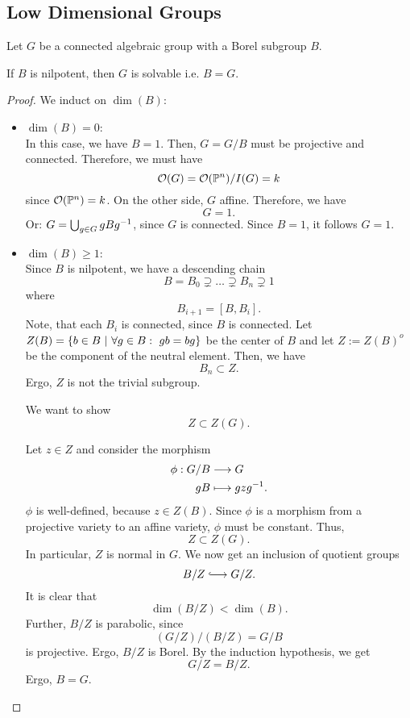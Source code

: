 \subsection{Low Dimensional Groups}
\begin{lemma}
	Let $G$ be a connected algebraic group with a Borel subgroup $B$.
	
If $B$ is nilpotent, then $G$ is solvable i.e. $B = G$.
\end{lemma}
\begin{proof}
	We induct on $\dim(B)$:
	\begin{itemize}
		\item $\dim(B) = 0$:\\
		In this case, we have $B = 1$. Then, $G=G/B$ must be projective and connected. Therefore, we must have
		\[ \mathcal{O}(G) = \mathcal{O}(\mathbb{P}^n) / I(G) = k \]
		since $\mathcal{O}(\mathbb{P}^n) = k$. On the other side, $G$ affine. Therefore, we have
		\[ G = 1. \]
		Or: $G = \bigcup_{g\in G} gBg^{-1}$, since $G$ is connected. Since $B = 1$, it follows $G = 1$.
		\item $\dim(B) \geq 1$:\\
		Since $B$ is nilpotent, we have a descending chain
		\[ B = B_0 \supsetneq \ldots \supsetneq B_n \supsetneq 1 \]
		where
		\[ B_{i+1} = [B, B_i]. \]
		Note, that each $B_i$ is connected, since $B$ is connected.
		Let $Z(B) = \left\lbrace b \in B ~ | ~ \forall g \in B:~ gb=bg\right\rbrace$ be the center of $B$ and let $Z:= Z(B)^o$ be the component of the neutral element. Then, we have
		\[ B_{n} \subset Z.  \]
		Ergo, $Z$ is not the trivial subgroup.
		
		We want to show
		\[ Z \subset Z(G). \]
		
		Let $z \in Z$ and consider the morphism
		\begin{align*}
		\phi : G/B & \overset{}{\longrightarrow} G\\
		gB & \longmapsto gzg^{-1}.
		\end{align*}
		$\phi$ is well-defined, because $z \in Z(B)$. Since $\phi$ is a morphism from a projective variety to an affine variety, $\phi$ must be constant. Thus,
		\[ Z \subset Z(G). \]
		In particular, $Z$ is normal in $G$. We now get an inclusion of quotient groups
		\[ B/Z \Inj{} G/Z. \]
		It is clear that
		\[ \dim(B/Z) < \dim(B). \]
		Further, $B/Z$ is parabolic, since
		\[ (G/Z) / (B/Z) = G/B \]
		is projective. Ergo, $B/Z$ is Borel. By the induction hypothesis, we get
		\[ G/Z = B/Z. \]
		Ergo, $B = G$.
	\end{itemize}
\end{proof}

